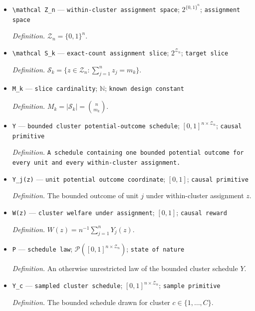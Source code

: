 \documentclass{article}
\begin{document}
\begin{itemize}
  \par\smallskip\noindent\emph{Definition.} \(\pi_k=m_k/n\) for \(k\in\mathcal K\).
  \item \texttt{\textbackslash{}\allowbreak{}mathcal Z\_\allowbreak{}n} --- \texttt{within-\allowbreak{}cluster assignment space}; \(2^{\{0,1\}^n}\); \texttt{assignment space}
  \par\smallskip\noindent\emph{Definition.} \(\mathcal Z_n=\{0,1\}^n\).
  \item \texttt{\textbackslash{}\allowbreak{}mathcal S\_\allowbreak{}k} --- \texttt{exact-\allowbreak{}count assignment slice}; \(2^{\mathcal Z_n}\); \texttt{target slice}
  \par\smallskip\noindent\emph{Definition.} \(\mathcal S_k=\{z\in\mathcal Z_n:\sum_{j=1}^n z_j=m_k\}\).
  \item \texttt{M\_\allowbreak{}k} --- \texttt{slice cardinality}; \(\mathbb N\); \texttt{known design constant}
  \par\smallskip\noindent\emph{Definition.} \(M_k=|\mathcal S_k|=\binom{n}{m_k}\).
  \item \texttt{Y} --- \texttt{bounded cluster potential-\allowbreak{}outcome schedule}; \([0,1]^{n\times\mathcal Z_n}\); \texttt{causal primitive}
  \par\smallskip\noindent\emph{Definition.} \texttt{A schedule containing one bounded potential outcome for every unit and every within-\allowbreak{}cluster assignment.}
  \item \texttt{Y\_\allowbreak{}j(z)} --- \texttt{unit potential outcome coordinate}; \([0,1]\); \texttt{causal primitive}
  \par\smallskip\noindent\emph{Definition.} The bounded outcome of unit \(j\) under within-cluster assignment \(z\).
  \item \texttt{W(z)} --- \texttt{cluster welfare under assignment}; \([0,1]\); \texttt{causal reward}
  \par\smallskip\noindent\emph{Definition.} \(W(z)=n^{-1}\sum_{j=1}^nY_j(z)\).
  \item \texttt{P} --- \texttt{schedule law}; \(\mathcal P([0,1]^{n\times\mathcal Z_n})\); \texttt{state of nature}
  \par\smallskip\noindent\emph{Definition.} An otherwise unrestricted law of the bounded cluster schedule \(Y\).
  \item \texttt{Y\_\allowbreak{}c} --- \texttt{sampled cluster schedule}; \([0,1]^{n\times\mathcal Z_n}\); \texttt{sample primitive}
  \par\smallskip\noindent\emph{Definition.} The bounded schedule drawn for cluster \(c\in\{1,\ldots,C\}\).

\end{itemize}
\end{document}
